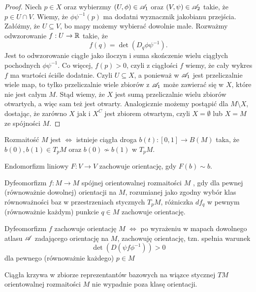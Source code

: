 \begin{proof}
  Niech $p\in X$ oraz wybierzmy $(U,\phi)\in\mathcal{A}_1$ oraz $(V,\psi)\in\mathcal{A}_2$ takie, że $p\in U\cap V$. Wiemy, że $\phi\psi^{-1}(p)$ ma dodatni wyznacznik jakobianu przejścia. Załóżmy, że $U\subseteq V$, bo mapy możemy wybierać dowolnie małe. Rozważmy odwzorowanie $f:U\to\mathbb{R}$ takie, że 
  $$f(q)=\det(D_q\phi\psi^{-1}).$$ 
  Jest to odwzorowanie ciągłe jako iloczyn i suma skończenie wielu ciągłych pochodnych $\phi\psi^{-1}$. Co więcej, $f(p)>0$, czyli z ciągłości $f$ wiemy, że cały wykres $f$ ma wartości ściśle dodatnie. Czyli $U\subseteq X$, a ponieważ w $\mathcal{A}_1$ jest przeliczalnie wiele map, to tylko przeliczalnie wiele zbiorów z $\mathcal{A}_1$ może zawierać się w $X$, które nie jest całym $M$. Stąd wiemy, że $X$ jest sumą przeliczalnie wielu zbiorów otwartych, a więc sam też jest otwarty. Analogicznie możemy postąpić dla $M\setminus X$, dostając, że zarówno $X$ jak i $X^C$ jest zbiorem otwartym, czyli $X=\emptyset$ lub $X=M$ ze spójności $M$.
\end{proof}

\begin{fact}
  Rozmaitość $M$ jest  $\iff$ istnieje ciągła droga $b(t):[0,1]\to B(M)$ taka, że $b(0),b(1)\in T_pM$ oraz $b(0)\not\sim b(1)$ w $T_pM$.
\end{fact}


Endomorfizm liniowy $F:V\to V$ zachowuje orientację, gdy $F(b)\sim b$.

\begin{definition}
  Dyfeomorfizm $f:M\to M$ spójnej orientowalnej rozmaitości $M$ , gdy dla pewnej (równoważnie dowolnej) orientacji na $M$, rozumianej jako zgodny wybór klas równoważności baz w przestrzeniach stycznych $T_pM$, różniczka $df_q$ w pewnym (równoważnie każdym)  punkcie $q\in M$ zachowuje orientację.
\end{definition}

\begin{remark} Dyfeomorfizm $f$ zachowuje orientację $M$ $\iff$ po wyrażeniu w mapach dowolnego atlasu $\mathcal{A}$ zadającego orientację na $M$, zachowuję orientację, tzn. spełnia warunek
  $$\det(D(\psi f\phi^{-1}))>0$$
  dla pewnego (równoważnie każdego) $p\in M$
\end{remark}

\begin{remark}
  Ciągła krzywa w zbiorze reprezentantów bazowych na wiązce stycznej $TM$ orientowalnej rozmaitości $M$ nie wypadnie poza klasę orientacji.
\end{remark}

